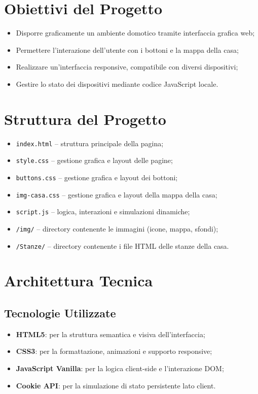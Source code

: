 \documentclass[a4paper,12pt]{article}
\begin{document}
\section{Obiettivi del Progetto}

\begin{itemize}
  \item Disporre graficamente un ambiente domotico tramite interfaccia grafica web;
  \item Permettere l'interazione dell'utente con i bottoni e la mappa della casa;
  \item Realizzare un’interfaccia responsive, compatibile con diversi dispositivi;
  \item Gestire lo stato dei dispositivi mediante codice JavaScript locale.
\end{itemize}

\section{Struttura del Progetto}

\begin{itemize}
  \item \texttt{index.html} – struttura principale della pagina;
  \item \texttt{style.css} – gestione grafica e layout delle pagine;
  \item \texttt{buttons.css} – gestione grafica e layout dei bottoni;
  \item \texttt{img-casa.css} – gestione grafica e layout della mappa della casa;
  \item \texttt{script.js} – logica, interazioni e simulazioni dinamiche;
  \item \texttt{/img/} – directory contenente le immagini (icone, mappa, sfondi);
  \item \texttt{/Stanze/} – directory contenente i file HTML delle stanze della casa.
\end{itemize}

\section{Architettura Tecnica}

\subsection{Tecnologie Utilizzate}

\begin{itemize}
  \item \textbf{HTML5}: per la struttura semantica e visiva dell’interfaccia;
  \item \textbf{CSS3}: per la formattazione, animazioni e supporto responsive;
  \item \textbf{JavaScript Vanilla}: per la logica client-side e l’interazione DOM;
  \item \textbf{Cookie API}: per la simulazione di stato persistente lato client.
\end{itemize}
\end{document}
